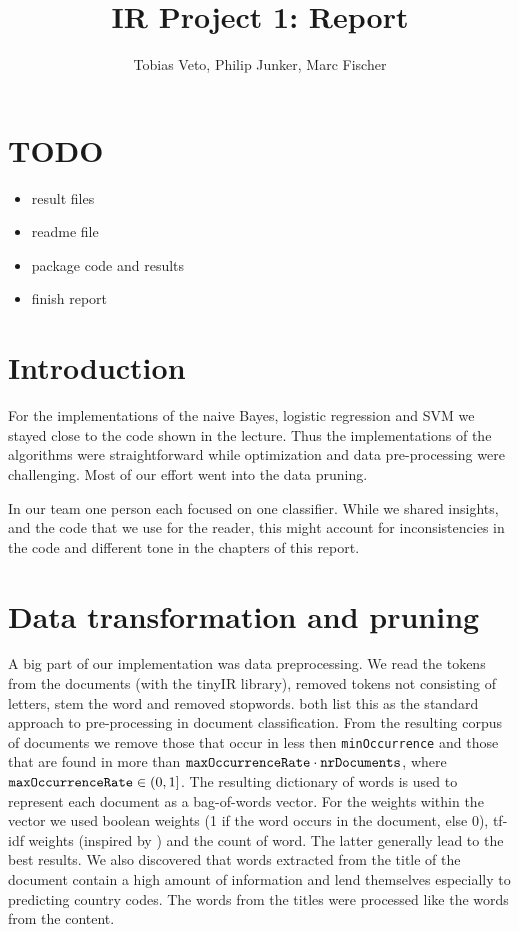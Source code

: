 \documentclass{article}
\title{IR Project 1: Report}
\author{Tobias Veto, Philip Junker, Marc Fischer}
\begin{document}
\section*{TODO}
\begin{itemize}
	\item result files
	\item readme file
	\item package code and results
	\item finish report
\end{itemize}


\section*{Introduction}
For the implementations of the naive Bayes, logistic regression and SVM we stayed close to the code shown in the lecture. Thus the implementations of the algorithms were straightforward while optimization and data pre-processing were challenging. Most of our effort went into the data pruning.

In our team one person each focused on one classifier. While we shared insights, and the code that we use for the reader, this might account for inconsistencies in the code and different tone in the chapters of this report.


\section*{Data transformation and pruning}
A big part of our implementation was data preprocessing. We read the tokens from the documents (with the tinyIR library), removed tokens not consisting of letters, stem the word and removed stopwords. \cite{joachims_text_1998,ozgur_text_2005} both list this as the standard approach to pre-processing in document classification. From the resulting corpus of documents we remove those that occur in less then \texttt{minOccurrence} and those that are found in more than $\text{\texttt{maxOccurrenceRate}} \cdot \text{\texttt{nrDocuments}}$, where $\text{\texttt{maxOccurrenceRate}} \in (0, 1]$.
The resulting dictionary of words is used to represent each document as a bag-of-words vector. For the weights within the vector we used boolean weights (1 if the word occurs in the document, else 0), tf-idf weights (inspired by \cite{ozgur_text_2005}) and the count of word. The latter generally lead to the best results.
We also discovered  that words extracted from the title of the document contain a high amount of information and lend themselves especially to predicting country codes. The words from the titles were processed like the words from the content.
\end{document}
